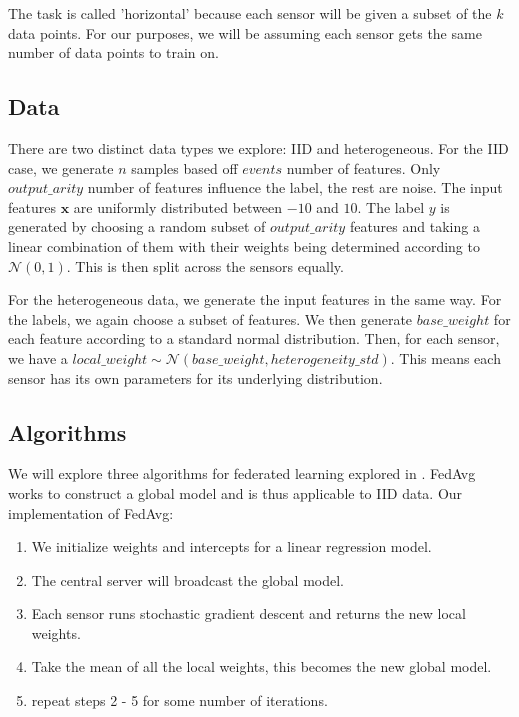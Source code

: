 \documentclass{article}
\begin{document}
The task is called 'horizontal' because each sensor will be given a subset of the $k$ data points. For our purposes, we will be assuming each sensor gets the same number of data points to train on. 

\subsection{Data}
There are two distinct data types we explore: IID and heterogeneous. For the IID case, we generate $n$ samples based off $events$ number of features. Only $output\_ arity$ number of features influence the label, the rest are noise. The input features $\mathbf{x}$ are uniformly distributed between $-10$ and $10$. The label $y$ is generated by choosing a random subset of $output\_arity$ features and taking a linear combination of them with their weights being determined according to $\mathcal N (0, 1)$. This is then split across the sensors equally.

For the heterogeneous data, we generate the input features in the same way. For the labels, we again choose a subset of features. We then generate $base\_weight$ for each feature according to a standard normal distribution. Then, for each sensor, we have a $local\_weight \sim \mathcal N (base\_weight, heterogeneity\_std)$. This means each sensor has its own parameters for its underlying distribution.

\subsection{Algorithms}

We will explore three algorithms for federated learning explored in \cite{chen2024}. FedAvg works to construct a global model and is thus applicable to IID data. 
Our implementation of FedAvg:
\begin{enumerate}
    \item We initialize weights and intercepts for a linear regression model.
    \item The central server will broadcast the global model.
    \item Each sensor runs stochastic gradient descent and returns the new local weights.
    \item Take the mean of all the local weights, this becomes the new global model.
    \item repeat steps 2 - 5 for some number of iterations.
\end{enumerate}
\end{document}
